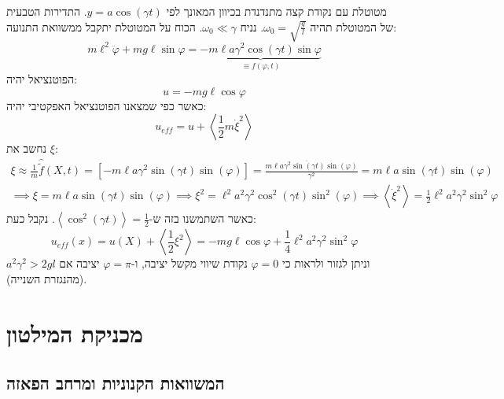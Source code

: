 \documentclass{tstextbook}
\begin{document}
\begin{example}
מטוטלת עם נקודת קצה מתנדנדת בכיוון המאונך לפי \(y=a\cos\left( \gamma t \right)\). 
התדירות הטבעית של המטוטלת תהיה \(\omega_{0}=\sqrt{ \frac{g}{l} }\). נניח \(\omega_{0}\ll \gamma\). הכוח על המטוטלת יתקבל ממשוואת התנועה:
$$m\ell^{2}{\ddot{\varphi}}+m g\ell\sin\varphi=\underbrace{-m\ell a\gamma^{2}\cos\left(\gamma t\right)\sin\varphi}_{\equiv f(\varphi,t)}$$
הפוטנציאל יהיה:
$$u=-mg\ell \cos \varphi$$
כאשר כפי שמצאנו הפוטנציאל האפקטיבי יהיה:
$$u_{eff}=u+\left\langle  \frac{1}{2}m\dot{\xi}^2 \right\rangle $$
נחשב את \(\xi\):
$$\begin{array}{c}{{\xi\approx\displaystyle\frac{1}{m}\hat{\tilde{f}}\left(X,t\right)=\left[-m\ell a\gamma^{2}\sin\left(\gamma t\right)\sin\left(\varphi\right)\right]=\displaystyle\frac{m\ell a\gamma^{2}\ddot{\sin\left(\gamma t\right)}\sin\left(\varphi\right)}{\gamma^{2}}=m\ell a\sin\left(\gamma t\right)\sin\left(\varphi\right)}}\\ {{\implies  \xi=m\ell a\sin\left(\gamma t\right)\sin\left(\varphi\right)}} {{\implies \xi^{2}=\ell^{2}a^{2}\gamma^{2}\cos^{2}\left(\gamma t\right)\sin^{2}\left(\varphi\right)}} {{\implies  \left\langle\dot{\xi}^{2}\right\rangle=\frac{1}{2}\ell^{2}a^{2}\gamma^{2}\sin^{2}\varphi}}\end{array}$$
כאשר השתמשנו בזה ש-\(\left\langle  \cos^2\left( \gamma t \right) \right\rangle=\frac{1}{2}\). נקבל כעת:
$$u_{e f f}\left(x\right)=u\left(X\right)+\left\langle\frac{1}{2}\xi^{2}\right\rangle=-m g\ell\cos\varphi+\frac{1}{4}\ell^{2}a^{2}\gamma^{2}\sin^{2}\varphi$$
וניתן לגזור ולראות כי \(\varphi=0\) נקודת שיווי מקשל יציבה, ו-\(\varphi=\pi\) יציבה אם \(a^2\gamma^2>2gl\)(מהנגזרת השנייה).

\end{example}
\chapter{מכניקת המילטון}

\section{המשוואות הקנוניות ומרחב הפאזה}
\end{document}

